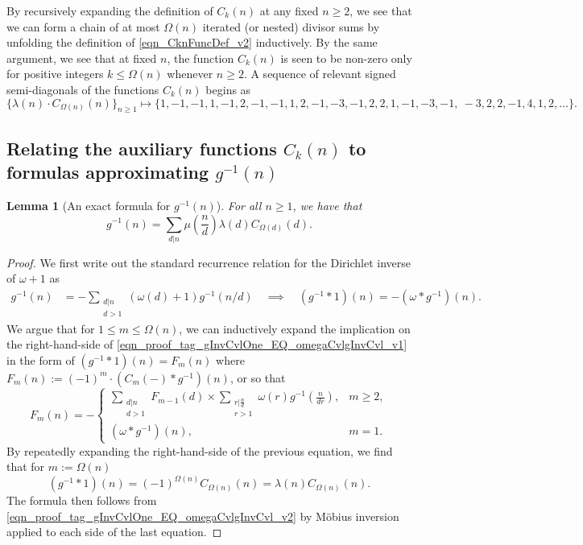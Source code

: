 \documentclass[11pt,reqno,a4letter]{article}
\numberwithin{figure}{section}
\numberwithin{table}{section}
\newcommand{\seqnum}[1]{\href{http://oeis.org/#1}{\color{ProcessBlue}{\underline{#1}}}}
\theoremstyle{plain}
\newtheorem{lemma}[theorem]{Lemma}
\numberwithin{theorem}{section}
\theoremstyle{definition}
\begin{document}
By recursively expanding the definition of $C_k(n)$ 
at any fixed $n \geq 2$, we see that 
we can form a chain of at most $\Omega(n)$ iterated (or nested) divisor sums by 
unfolding the definition of \eqref{eqn_CknFuncDef_v2} inductively. 
By the same argument, we see that at fixed $n$, the function 
$C_k(n)$ is seen to be non-zero only for positive integers 
$k \leq \Omega(n)$ whenever $n \geq 2$. 
A sequence of relevant signed semi-diagonals of the functions $C_k(n)$ begins as 
\cite[\seqnum{A008480}]{OEIS} 
\[
\{\lambda(n) \cdot C_{\Omega(n)}(n) \}_{n \geq 1} \mapsto \{
     1, -1, -1, 1, -1, 2, -1, -1, 1, 2, -1, -3, -1, 2, 2, 1, -1, -3, -1, \
     -3, 2, 2, -1, 4, 1, 2, \ldots \}. 
\]

\subsection{Relating the auxiliary functions $C_k(n)$ to formulas approximating $g^{-1}(n)$} 
\label{subSection_Relating_CknFuncs_to_gInvn} 

\begin{lemma}[An exact formula for $g^{-1}(n)$] 
\label{lemma_AnExactFormulaFor_gInvByMobiusInv_v1} 
For all $n \geq 1$, we have that 
\[
g^{-1}(n) = \sum_{d|n} \mu\left(\frac{n}{d}\right) \lambda(d) C_{\Omega(d)}(d). 
\]
\end{lemma}
\begin{proof} 
We first write out the standard recurrence relation for the Dirichlet inverse of 
$\omega+1$ as 
\begin{align} 
\label{eqn_proof_tag_gInvCvlOne_EQ_omegaCvlgInvCvl_v1} 
g^{-1}(n) & = - \sum_{\substack{d|n \\ d>1}} (\omega(d) + 1) g^{-1}(n/d) 
     \quad\implies\quad 
     (g^{-1} \ast 1)(n) = -(\omega \ast g^{-1})(n). 
\end{align} 
We argue that for $1 \leq m \leq \Omega(n)$, we can inductively expand the 
implication on the right-hand-side of \eqref{eqn_proof_tag_gInvCvlOne_EQ_omegaCvlgInvCvl_v1} 
in the form of $(g^{-1} \ast 1)(n) = F_m(n)$ where 
$F_m(n) := (-1)^{m} \cdot (C_m(-) \ast g^{-1})(n)$, or so that 
\[
F_m(n) = - 
     \begin{cases} 
     \sum\limits_{\substack{d|n \\ d > 1}} F_{m-1}(d) \times \sum\limits_{\substack{r|\frac{n}{d} \\ r > 1}} 
     \omega(r) g^{-1}\left(\frac{n}{dr}\right), & m \geq 2, \\ 
     (\omega \ast g^{-1})(n), & m = 1. 
     \end{cases} 
\]
By repeatedly expanding the right-hand-side of the previous equation, 
we find that for $m := \Omega(n)$ 
\begin{equation} 
\label{eqn_proof_tag_gInvCvlOne_EQ_omegaCvlgInvCvl_v2} 
(g^{-1} \ast 1)(n) = (-1)^{\Omega(n)} C_{\Omega(n)}(n) = \lambda(n) C_{\Omega(n)}(n). 
\end{equation} 
The formula then follows from \eqref{eqn_proof_tag_gInvCvlOne_EQ_omegaCvlgInvCvl_v2} 
by M\"obius inversion applied to each side of the last equation. 
\end{proof} 
\end{document}
